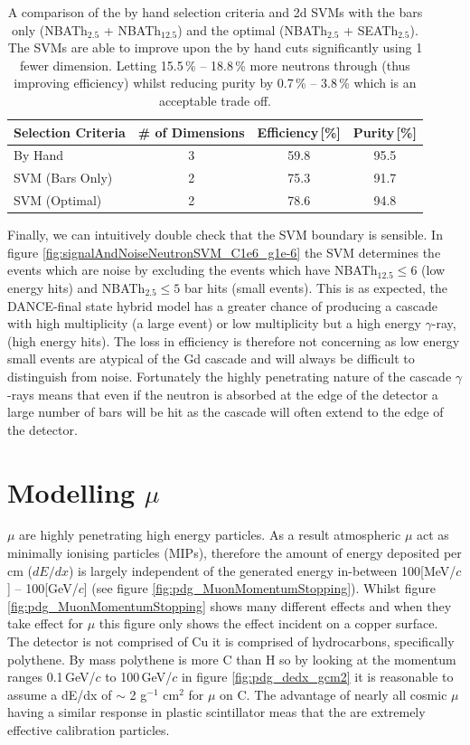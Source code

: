 \begin{table}[!h]
\centering
\begin{tabular}{lccc}  
\toprule
Selection Criteria & \# of Dimensions & Efficiency\,[\%] & Purity\,[\%] \\
\midrule
By Hand            & 3                & 59.8             & 95.5         \\
SVM (Bars Only)    & 2                & 75.3             & 91.7         \\
SVM (Optimal)      & 2                & 78.6             & 94.8         \\
\bottomrule  
\end{tabular}
\caption{A comparison of the by hand selection criteria and 2d SVMs with the bars only (NBATh$_{2.5}$ + NBATh$_{12.5}$) and the optimal (NBATh$_{2.5}$ + SEATh$_{2.5}$). The SVMs are able to improve upon the by hand cuts significantly using 1 fewer dimension. Letting 15.5\,\% -- 18.8\,\% more neutrons through (thus improving efficiency) whilst reducing purity by 0.7\,\% -- 3.8\,\% which is an acceptable trade off.}
\label{tab:svmSelection}
\end{table}

Finally, we can intuitively double check that the SVM boundary is sensible. In figure \ref{fig:signalAndNoiseNeutronSVM_C1e6_g1e-6} the SVM determines the events which are noise by excluding the events which have NBATh$_{12.5}\leq 6$ (low energy hits) and NBATh$_2.5 \leq 5$ bar hits (small events). This is as expected, the DANCE-final state hybrid model has a greater chance of producing a cascade with high multiplicity (a large event) or low multiplicity but a high energy $\gamma$-ray, (high energy hits). The loss in efficiency is therefore not concerning as low energy small events are atypical of the Gd cascade and will always be difficult to distinguish from noise. Fortunately the highly penetrating nature of the cascade $\gamma$-rays means that even if the neutron is absorbed at the edge of the detector a large number of bars will be hit as the cascade will often extend to the edge of the detector. 

\clearpage
\section{Modelling $\mu$}
$\mu$ are highly penetrating high energy particles. As a result atmospheric $\mu$ act as minimally ionising particles (MIPs), therefore the amount of energy deposited per cm ($dE/dx$) is largely independent of the generated energy in-between 100[MeV/$c$] -- 100[GeV/$c$] (see figure \ref{fig:pdg_MuonMomentumStopping}). Whilst figure \ref{fig:pdg_MuonMomentumStopping} shows many different effects and when they take effect for $\mu$ this figure only shows the effect incident on a copper surface. The detector is not comprised of Cu it is comprised of hydrocarbons, specifically polythene. By mass polythene is more C than H so by looking at the momentum ranges 0.1\,GeV/$c$ to 100\,GeV/$c$ in figure \ref{fig:pdg_dedx_gcm2} it is reasonable to assume a dE/dx of $\sim$ 2 g$^{-1}$ cm$^2$ for $\mu$ on C. The advantage of nearly all cosmic $\mu$ having a similar response in plastic scintillator meas that the are extremely effective calibration particles. 

